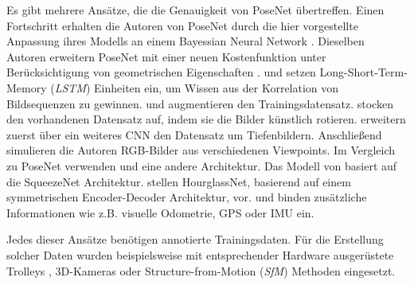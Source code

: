 Es gibt mehrere Ansätze, die die Genauigkeit von PoseNet übertreffen.
Einen Fortschritt erhalten die Autoren von PoseNet durch die hier \cite{kendallModellingUncertaintyDeep2015a} vorgestellte Anpassung ihres Modells an einem Bayessian Neural Network \cite{denkerTransformingNeuralNetOutput1991, mackayPracticalBayesianFramework1991}.
Dieselben Autoren erweitern PoseNet mit einer neuen Kostenfunktion unter Berücksichtigung von geometrischen Eigenschaften \cite{kendallGeometricLossFunctions2017}. \citet{walchImagebasedLocalizationUsing2016} und \citet{clarkVidLocDeepSpatioTemporal2017} setzen Long-Short-Term-Memory (\textit{LSTM}) \cite{hochreiterLongShortTermMemory1997a} Einheiten ein, um Wissen aus der Korrelation von Bildsequenzen zu gewinnen. \citet{wuDelvingDeeperConvolutional2017} und \citet{naseerDeepRegressionMonocular2017} augmentieren den Trainingsdatensatz. \citet{wuDelvingDeeperConvolutional2017} stocken den vorhandenen Datensatz auf, indem sie die Bilder künstlich rotieren. \citet{naseerDeepRegressionMonocular2017} erweitern zuerst über ein weiteres CNN den Datensatz um Tiefenbildern. Anschließend simulieren die Autoren RGB-Bilder aus verschiedenen Viewpoints. Im Vergleich zu PoseNet verwenden \citet{mullerSQUEEZEPOSENETIMAGEBASED2017} und \citet{melekhovImageBasedLocalizationUsing2017} eine andere Architektur. 
Das Modell von \citet{mullerSQUEEZEPOSENETIMAGEBASED2017} basiert auf die SqueezeNet \cite{iandolaSqueezeNetAlexNetlevelAccuracy2016} Architektur. \citet{melekhovImageBasedLocalizationUsing2017} stellen HourglassNet, basierend auf einem symmetrischen Encoder-Decoder Architektur, vor. \citet{brahmbhattGeometryAwareLearningMaps2018} und \citet{valadaDeepAuxiliaryLearning2018, valadaIncorporatingSemanticGeometric} binden zusätzliche Informationen wie z.B. visuelle Odometrie, GPS oder IMU ein. 

Jedes dieser Ansätze benötigen annotierte Trainingsdaten. Für die Erstellung solcher Daten wurden beispielsweise mit entsprechender Hardware ausgerüstete Trolleys \cite{huitlTUMindoorExtensiveImage2012}, 3D-Kameras \cite{izadiKinectFusionRealtime3D2011} oder Structure-from-Motion (\textit{SfM}) Methoden \cite{kendallPoseNetConvolutionalNetwork2015} eingesetzt.

